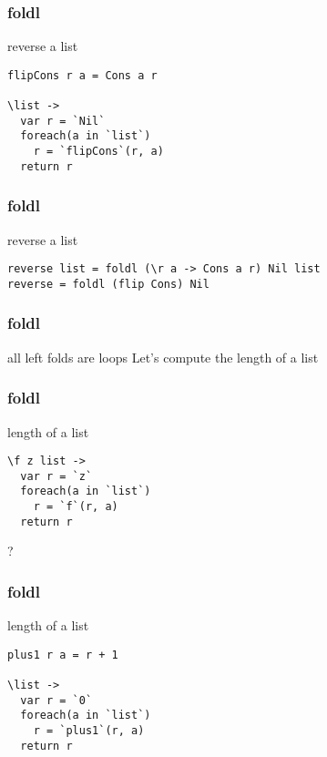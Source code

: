 \begin{frame}[fragile]
\frametitle{foldl}
\begin{block}{reverse a list}
\begin{lstlisting}[style=haskell,basicstyle=\scriptsize\ttfamily,mathescape]
flipCons r a = Cons a r

\list ->
  var r = `Nil`
  foreach(a in `list`)
    r = `flipCons`(r, a)
  return r
\end{lstlisting}
\end{block}
\end{frame}

\begin{frame}[fragile]
\frametitle{foldl}
\begin{block}{reverse a list}
\begin{lstlisting}[style=haskell,basicstyle=\scriptsize\ttfamily,mathescape]
reverse list = foldl (\r a -> Cons a r) Nil list
reverse = foldl (flip Cons) Nil
\end{lstlisting}
\end{block}
\end{frame}

\begin{frame}[fragile]
\frametitle{foldl}
\begin{block}{all left folds are loops}
Let's compute the length of a list
\end{block}
\end{frame}

\begin{frame}[fragile]
\frametitle{foldl}
\begin{block}{length of a list}
\begin{lstlisting}[style=haskell,basicstyle=\scriptsize\ttfamily,mathescape]
\f z list ->
  var r = `z`
  foreach(a in `list`)
    r = `f`(r, a)
  return r
\end{lstlisting}
\end{block}
\begin{center}
\LARGE
?
\end{center}
\end{frame}

\begin{frame}[fragile]
\frametitle{foldl}
\begin{block}{length of a list}
\begin{lstlisting}[style=haskell,basicstyle=\scriptsize\ttfamily,mathescape]
plus1 r a = r + 1

\list ->
  var r = `0`
  foreach(a in `list`)
    r = `plus1`(r, a)
  return r
\end{lstlisting}
\end{block}
\end{frame}

